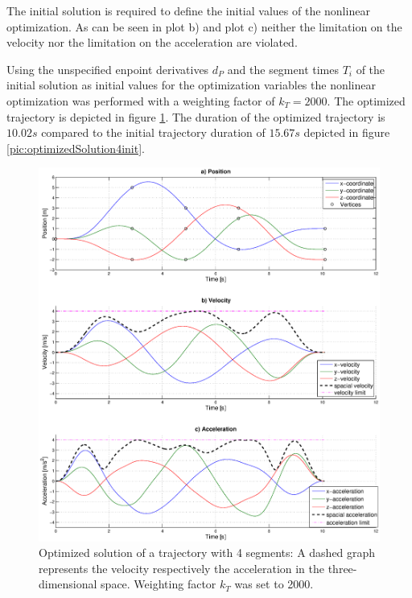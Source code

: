 The initial solution is required to define the initial values of the nonlinear optimization.
As can be seen in plot b) and plot c) neither the limitation on the velocity nor the limitation on the acceleration are violated.



Using the unspecified enpoint derivatives $d_P$ and the segment times $T_i$ of the initial solution as initial values for the optimization variables the nonlinear optimization was performed with a weighting factor of $k_T = 2000$. The optimized trajectory is depicted in figure \ref{pic:optimizedSolution4optik2000}. The duration of the optimized trajectory is $10.02s$ compared to the initial trajectory duration of $15.67s$ depicted in figure \ref{pic:optimizedSolution4init}.




\begin{figure}[H]
   \centering
   \includegraphics[trim = 33mm 30mm 30mm 15mm,clip,width=1\textwidth]{pics/4SegOpti10s01k2000.eps}
   \caption{Optimized solution of a trajectory with 4 segments: A dashed graph represents the velocity respectively the acceleration in the three-dimensional space. Weighting factor $k_T$ was set to 2000.}
   \label{pic:optimizedSolution4optik2000} 
\end{figure}

